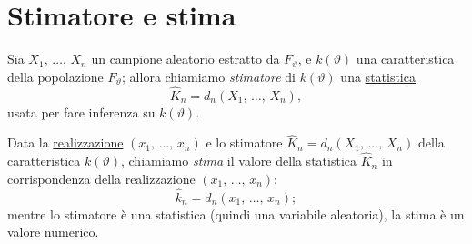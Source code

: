     \section{Stimatore e stima}
        \begin{defn}[Stimatore]
            Sia $X_1,\, \ldots,\, X_{n}$ un campione aleatorio estratto da $F_\vartheta$, e $k(\vartheta)$ 
            una caratteristica della popolazione $F_\vartheta$; allora chiamiamo \emph{stimatore} 
            di $k(\vartheta)$ una \underline{statistica} \[
                \hat{K}_n = d_n(X_1,\, \ldots,\, X_{n})
            ,\] usata per fare inferenza su $k(\vartheta)$.
        \end{defn}
        \begin{defn}[Stima]
            Data la \underline{realizzazione} $(x_1,\, \ldots,\, x_{n})$ e lo stimatore 
            $\hat{K}_n = d_n(X_1,\, \ldots,\, X_{n})$ della caratteristica $k(\vartheta)$,
            chiamiamo \emph{stima} il valore della statistica $\hat{K}_n$ in corrispondenza 
            della realizzazione $(x_1,\, \ldots,\, x_{n})$: \[
                \hat{k}_n = d_n(x_1,\, \ldots,\, x_{n})
            ;\] mentre lo stimatore è una statistica (quindi una variabile aleatoria), 
            la stima è un valore numerico.
        \end{defn}
